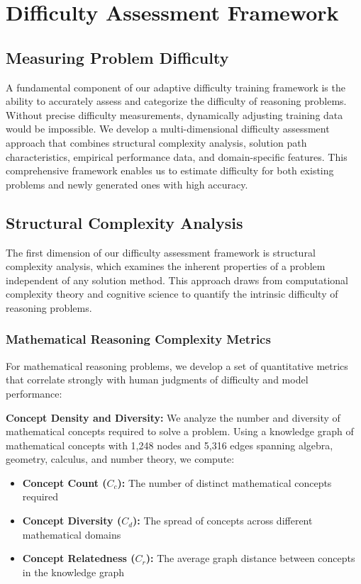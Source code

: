 \section{Difficulty Assessment Framework}
\subsection{Measuring Problem Difficulty}

A fundamental component of our adaptive difficulty training framework is the ability to accurately assess and categorize the difficulty of reasoning problems. Without precise difficulty measurements, dynamically adjusting training data would be impossible. We develop a multi-dimensional difficulty assessment approach that combines structural complexity analysis, solution path characteristics, empirical performance data, and domain-specific features. This comprehensive framework enables us to estimate difficulty for both existing problems and newly generated ones with high accuracy.

\subsection{Structural Complexity Analysis}

The first dimension of our difficulty assessment framework is structural complexity analysis, which examines the inherent properties of a problem independent of any solution method. This approach draws from computational complexity theory and cognitive science to quantify the intrinsic difficulty of reasoning problems.

\subsubsection{Mathematical Reasoning Complexity Metrics}

For mathematical reasoning problems, we develop a set of quantitative metrics that correlate strongly with human judgments of difficulty and model performance:

\textbf{Concept Density and Diversity:} We analyze the number and diversity of mathematical concepts required to solve a problem. Using a knowledge graph of mathematical concepts with 1,248 nodes and 5,316 edges spanning algebra, geometry, calculus, and number theory, we compute:

\begin{itemize}
    \item \textbf{Concept Count ($C_c$):} The number of distinct mathematical concepts required
    \item \textbf{Concept Diversity ($C_d$):} The spread of concepts across different mathematical domains
    \item \textbf{Concept Relatedness ($C_r$):} The average graph distance between concepts in the knowledge graph
\end{itemize}

